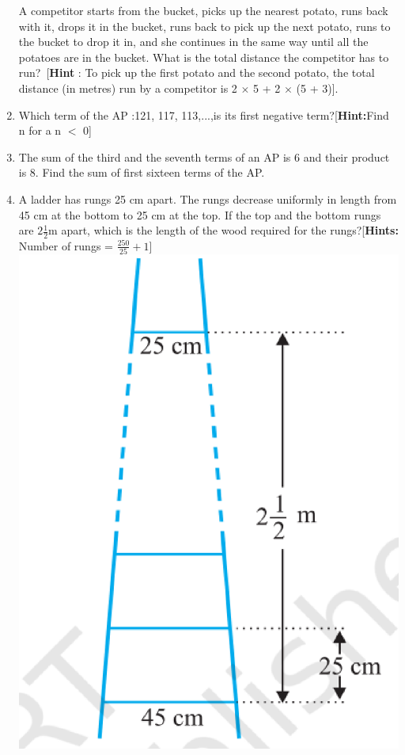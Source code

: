 \begin{enumerate}[label=\arabic*.,ref=\thesubsection.\theenumi]
A competitor starts from the bucket, picks up the nearest potato, runs back with it, drops it in the bucket, runs back to pick up the next potato, runs to the bucket to drop it in, and she continues in the same way until all the potatoes are in the bucket. What is the total distance the competitor has to run?\
[\textbf{Hint} : To pick up the first potato and the second potato, the total distance (in metres)
run by a competitor is 2 $\times$ 5 + 2 $\times$ (5 + 3)].
\item Which term of the AP :121, 117, 113,...,is its first negative term?[\textbf{Hint:}Find n for a n $<$ 0]
\item The sum of the third and the seventh terms of an AP is 6 and their product is 8. Find the sum of first sixteen terms of the AP.
\item A ladder has rungs 25 cm apart. The rungs decrease uniformly in length from 45 cm at the bottom to 25 cm at the top. If the top and the bottom rungs are $2\frac{1}{2}$m apart, which is the length of the wood required for the rungs?[\textbf{Hints:} Number of rungs = $\frac{250}{25}+1$]\\
\includegraphics[width=\columnwidth]{./figs/fig4.eps} 

\end{enumerate}
